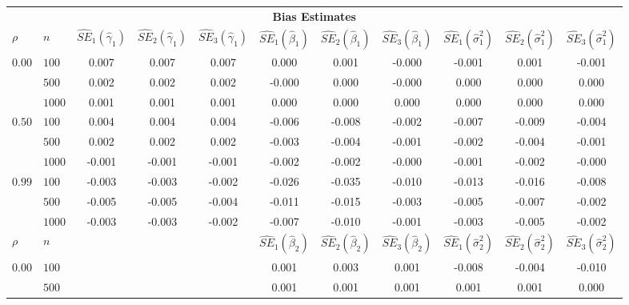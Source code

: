 \begin{landscape}
\begin{table}[ht]
\begin{center}
\begin{tabular}{llccccccccc}
   \hline \multicolumn{11}{c}{\textbf{Bias Estimates}}\\ $\rho$ & $n$ & $\widehat{SE}_1(\widehat{\gamma}_1)$ & $\widehat{SE}_2(\widehat{\gamma}_1)$ & $\widehat{SE}_3(\widehat{\gamma}_1)$ & $\widehat{SE}_1(\widehat{\beta}_1)$ & $\widehat{SE}_2(\widehat{\beta}_1)$ & $\widehat{SE}_3(\widehat{\beta}_1)$ & $\widehat{SE}_1(\widehat{\sigma}^2_1)$ & $\widehat{SE}_2(\widehat{\sigma}^2_1)$ & $\widehat{SE}_3(\widehat{\sigma}^2_1)$ \\ 
   \hline$0.00$ & $100$ & 0.007 & 0.007 & 0.007 & 0.000 & 0.001 & -0.000 & -0.001 & 0.001 & -0.001 \\ 
    & $500$ & 0.002 & 0.002 & 0.002 & -0.000 & 0.000 & -0.000 & 0.000 & 0.000 & 0.000 \\ 
    & $1000$ & 0.001 & 0.001 & 0.001 & 0.000 & 0.000 & 0.000 & 0.000 & 0.000 & 0.000 \\ 
  $0.50$ & $100$ & 0.004 & 0.004 & 0.004 & -0.006 & -0.008 & -0.002 & -0.007 & -0.009 & -0.004 \\ 
    & $500$ & 0.002 & 0.002 & 0.002 & -0.003 & -0.004 & -0.001 & -0.002 & -0.004 & -0.001 \\ 
    & $1000$ & -0.001 & -0.001 & -0.001 & -0.002 & -0.002 & -0.000 & -0.001 & -0.002 & -0.000 \\ 
  $0.99$ & $100$ & -0.003 & -0.003 & -0.002 & -0.026 & -0.035 & -0.010 & -0.013 & -0.016 & -0.008 \\ 
    & $500$ & -0.005 & -0.005 & -0.004 & -0.011 & -0.015 & -0.003 & -0.005 & -0.007 & -0.002 \\ 
    & $1000$ & -0.003 & -0.003 & -0.002 & -0.007 & -0.010 & -0.001 & -0.003 & -0.005 & -0.002 \\ 
   \hline$\rho$ & $n$ &   &   &   & $\widehat{SE}_1(\widehat{\beta}_2)$ & $\widehat{SE}_2(\widehat{\beta}_2)$ & $\widehat{SE}_3(\widehat{\beta}_2)$ & $\widehat{SE}_1(\widehat{\sigma}^2_2)$ & $\widehat{SE}_2(\widehat{\sigma}^2_2)$ & $\widehat{SE}_3(\widehat{\sigma}^2_2)$ \\ 
   \hline$0.00$ & $100$ &   &   &   & 0.001 & 0.003 & 0.001 & -0.008 & -0.004 & -0.010 \\ 
    & $500$ &   &   &   & 0.001 & 0.001 & 0.001 & 0.001 & 0.001 & 0.000 \\ 

\end{tabular}
\end{center}
\end{table}
\end{landscape}

